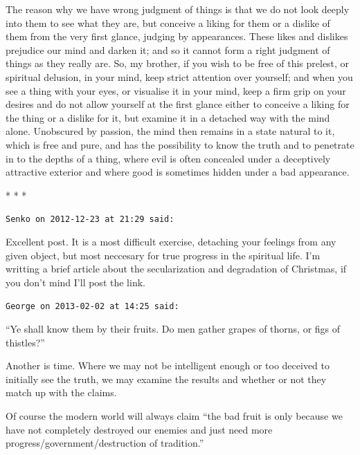 \begin{quotex}
The reason why we have wrong judgment of things is that we do not look deeply into them to see what they are, but conceive a liking for them or a dislike of them from the very first glance, judging by appearances. These likes and dislikes prejudice our mind and darken it; and so it cannot form a right judgment of things as they really are. So, my brother, if you wish to be free of this prelest, or spiritual delusion, in your mind, keep strict attention over yourself; and when you see a thing with your eyes, or visualise it in your mind, keep a firm grip on your desires and do not allow yourself at the first glance either to conceive a liking for the thing or a dislike for it, but examine it in a detached way with the mind alone. Unobscured by passion, the mind then remains in a state natural to it, which is free and pure, and has the possibility to know the truth and to penetrate in to the depths of a thing, where evil is often concealed under a deceptively attractive exterior and where good is sometimes hidden under a bad appearance.
\end{quotex}




\begin{center}* * *\end{center}

\begin{footnotesize}
\begin{sffamily}
\texttt{Senko on 2012-12-23 at 21:29 said:}

Excellent post. It is a most difficult exercise, detaching your feelings from any given object, but most neccesary for true progress in the spiritual life. I'm writting a brief article about the secularization and degradation of Christmas, if you don't mind I'll post the link.

\hfill

\texttt{George on 2013-02-02 at 14:25 said:}

``Ye shall know them by their fruits. Do men gather grapes of thorns, or figs of thistles?''

Another is time. Where we may not be intelligent enough or too deceived to initially see the truth, we may examine the results and whether or not they match up with the claims.

Of course the modern world will always claim ``the bad fruit is only because we have not completely destroyed our enemies and just need more progress/government/destruction of tradition.''


\hfill

\end{sffamily}
\end{footnotesize}

